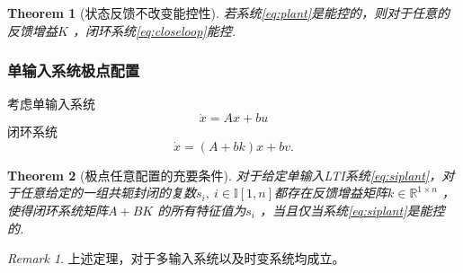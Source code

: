 \documentclass[14pt,a4paper]{article}
\theoremstyle{plain}
\newtheorem{thm}{Theorem}[section]
\theoremstyle{definition}
\theoremstyle{remark}
\newtheorem{rmk}{Remark}[section]
\theoremstyle{plain}
\theoremstyle{plain}
\theoremstyle{plain}
\theoremstyle{definition}
\theoremstyle{remark}
\numberwithin{equation}{section}
\begin{document}
			\begin{thm}[状态反馈不改变能控性]  
			\label{the:状态反馈不改变能控性}
				若系统\eqref{eq:plant}是能控的，则对于任意的反馈增益$K$ ，闭环系统\eqref{eq:closeloop}能控. 
			\end{thm}

			\subsubsection{单输入系统极点配置}%
			\label{ssub:单输入系统极点配置}
			
				考虑单输入系统
				\begin{equation}
				\label{eq:siplant}
					\dot x = Ax + bu
				\end{equation} 
				闭环系统
				\begin{equation}
				\label{eq:sicloseloop}
				\dot x = (A+bk)x + bv
				.\end{equation} 

			
				\begin{thm}[极点任意配置的充要条件]  
				\label{the:极点任意配置的充要条件}
				对于给定单输入LTI系统\eqref{eq:siplant}，对于任意给定的一组共轭封闭的复数$s_{i}, \ i\in \mathbb I [1,n]$都存在反馈增益矩阵$k\in \mathbb{R}^{1\times n}$ ，使得闭环系统矩阵$A+BK$ 的所有特征值为$s_{i}$ ，当且仅当系统\eqref{eq:siplant}是能控的. 
				\end{thm} 

				\begin{rmk}  
					上述定理，对于多输入系统以及时变系统均成立。
				\end{rmk} 
		
\end{document}
